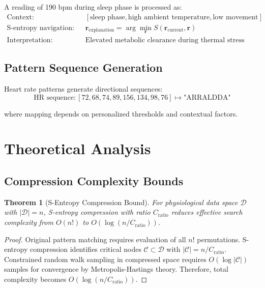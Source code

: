 \documentclass[12pt,a4paper]{article}
\newtheorem{theorem}{Theorem}
\begin{document}
\begin{example}
A reading of 190 bpm during sleep phase is processed as:
\begin{align}
\text{Context}: \quad &[\text{sleep phase}, \text{high ambient temperature}, \text{low movement}] \\
\text{S-entropy navigation}: \quad &\mathbf{r}_{\text{explanation}} = \arg\min_{\mathbf{r}} S(\mathbf{r}_{\text{current}}, \mathbf{r}) \\
\text{Interpretation}: \quad &\text{Elevated metabolic clearance during thermal stress}
\end{align}
\end{example}

\subsection{Pattern Sequence Generation}

Heart rate patterns generate directional sequences:
\begin{equation}
\text{HR sequence}: [72, 68, 74, 89, 156, 134, 98, 76] \mapsto \text{"ARRALDDA"}
\end{equation}

where mapping depends on personalized thresholds and contextual factors.

\section{Theoretical Analysis}

\subsection{Compression Complexity Bounds}

\begin{theorem}[S-Entropy Compression Bound]
For physiological data space $\mathcal{D}$ with $|\mathcal{D}| = n$, S-entropy compression with ratio $C_{\text{ratio}}$ reduces effective search complexity from $O(n!)$ to $O(\log(n/C_{\text{ratio}}))$.
\end{theorem}

\begin{proof}
Original pattern matching requires evaluation of all $n!$ permutations. S-entropy compression identifies critical nodes $\mathcal{C} \subset \mathcal{D}$ with $|\mathcal{C}| = n/C_{\text{ratio}}$. Constrained random walk sampling in compressed space requires $O(\log|\mathcal{C}|)$ samples for convergence by Metropolis-Hastings theory. Therefore, total complexity becomes $O(\log(n/C_{\text{ratio}}))$.
\end{proof}
\end{document}
